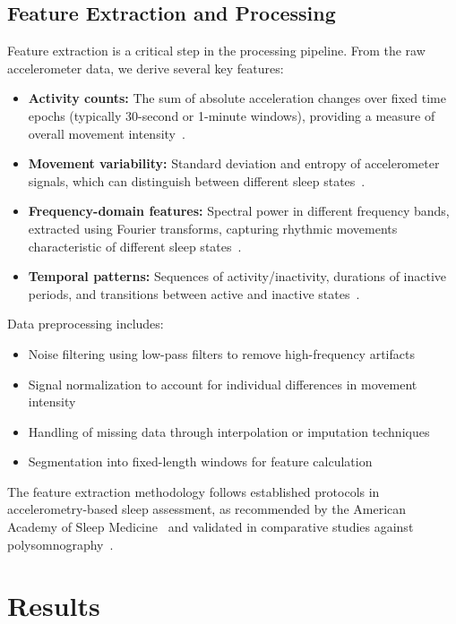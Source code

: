 \documentclass[conference]{IEEEtran}
\begin{document}
\subsection{Feature Extraction and Processing}
Feature extraction is a critical step in the processing pipeline. From the raw accelerometer data, we derive several key features:

\begin{itemize}
	\item \textbf{Activity counts:} The sum of absolute acceleration changes over fixed time epochs (typically 30-second or 1-minute windows), providing a measure of overall movement intensity~\cite{ancoli2003role, acebo2006}.
	\item \textbf{Movement variability:} Standard deviation and entropy of accelerometer signals, which can distinguish between different sleep states~\cite{sadeh1994activity, vanHees2015}.
	\item \textbf{Frequency-domain features:} Spectral power in different frequency bands, extracted using Fourier transforms, capturing rhythmic movements characteristic of different sleep states~\cite{zhang2020machine, griessenberger2013}.
	\item \textbf{Temporal patterns:} Sequences of activity/inactivity, durations of inactive periods, and transitions between active and inactive states~\cite{van2011review, sadeh2011, borbely1982}.
\end{itemize}

Data preprocessing includes:
\begin{itemize}
	\item Noise filtering using low-pass filters to remove high-frequency artifacts
	\item Signal normalization to account for individual differences in movement intensity
	\item Handling of missing data through interpolation or imputation techniques
	\item Segmentation into fixed-length windows for feature calculation
\end{itemize}

The feature extraction methodology follows established protocols in accelerometry-based sleep assessment, as recommended by the American Academy of Sleep Medicine~\cite{littner2003} and validated in comparative studies against polysomnography~\cite{kushida2001, sadeh2011}.

\section{Results}
\end{document}
